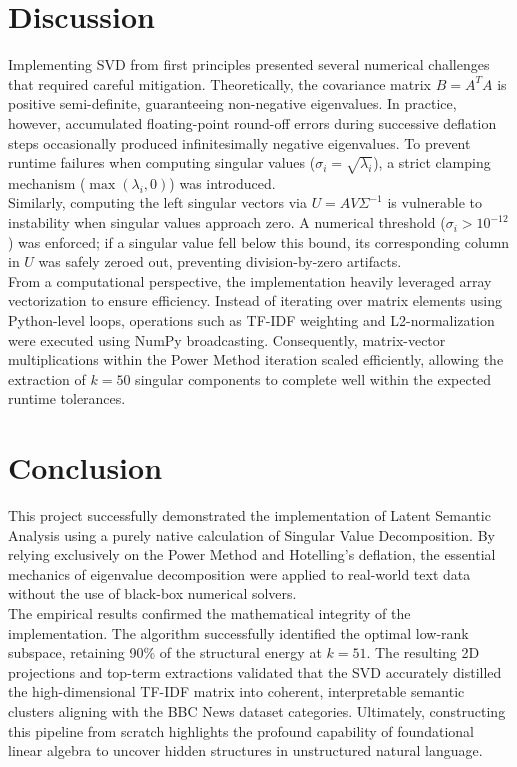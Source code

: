 \documentclass[conference]{IEEEtran}
\begin{document}
\section{Discussion}
Implementing SVD from first principles presented several numerical challenges that required careful mitigation. Theoretically, the covariance matrix $B = A^T A$ is positive semi-definite, guaranteeing non-negative eigenvalues. In practice, however, accumulated floating-point round-off errors during successive deflation steps occasionally produced infinitesimally negative eigenvalues. To prevent runtime failures when computing singular values ($\sigma_i = \sqrt{\lambda_i}$), a strict clamping mechanism ($\max(\lambda_i, 0)$) was introduced.
\\
Similarly, computing the left singular vectors via $U = A V \Sigma^{-1}$ is vulnerable to instability when singular values approach zero. A numerical threshold ($\sigma_i > 10^{-12}$) was enforced; if a singular value fell below this bound, its corresponding column in $U$ was safely zeroed out, preventing division-by-zero artifacts.
\\
From a computational perspective, the implementation heavily leveraged array vectorization to ensure efficiency. Instead of iterating over matrix elements using Python-level loops, operations such as TF-IDF weighting and L2-normalization were executed using NumPy broadcasting. Consequently, matrix-vector multiplications within the Power Method iteration scaled efficiently, allowing the extraction of $k=50$ singular components to complete well within the expected runtime tolerances.

\section{Conclusion}
This project successfully demonstrated the implementation of Latent Semantic Analysis using a purely native calculation of Singular Value Decomposition. By relying exclusively on the Power Method and Hotelling's deflation, the essential mechanics of eigenvalue decomposition were applied to real-world text data without the use of black-box numerical solvers.
\\
The empirical results confirmed the mathematical integrity of the implementation. The algorithm successfully identified the optimal low-rank subspace, retaining 90\% of the structural energy at $k=51$. The resulting 2D projections and top-term extractions validated that the SVD accurately distilled the high-dimensional TF-IDF matrix into coherent, interpretable semantic clusters aligning with the BBC News dataset categories. Ultimately, constructing this pipeline from scratch highlights the profound capability of foundational linear algebra to uncover hidden structures in unstructured natural language.
\end{document}
